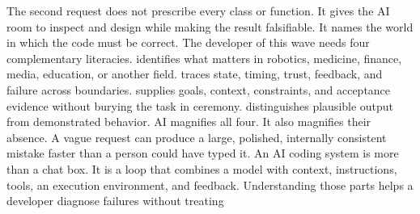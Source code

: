 {}\markdownRendererInterblockSeparator
{}The second request does not prescribe every class or function. It gives the AI\markdownRendererSoftLineBreak
{}room to inspect and design while making the result falsifiable. It names the\markdownRendererSoftLineBreak
{}world in which the code must be correct.\markdownRendererInterblockSeparator
{}
\markdownRendererSectionEnd \markdownRendererSectionBegin
{}\markdownRendererInterblockSeparator
{}The developer of this wave needs four complementary literacies.\markdownRendererInterblockSeparator
{}\markdownRendererOlBegin
{} identifies what matters in robotics, medicine, finance,\markdownRendererSoftLineBreak
{}media, education, or another field.\markdownRendererOlItemEnd 
{} traces state, timing, trust, feedback, and failure across\markdownRendererSoftLineBreak
{}boundaries.\markdownRendererOlItemEnd 
{} supplies goals, context, constraints, and\markdownRendererSoftLineBreak
{}acceptance evidence without burying the task in ceremony.\markdownRendererOlItemEnd 
{} distinguishes plausible output from demonstrated\markdownRendererSoftLineBreak
{}behavior.\markdownRendererOlItemEnd 
\markdownRendererOlEnd \markdownRendererInterblockSeparator
{}AI magnifies all four. It also magnifies their absence. A vague request can\markdownRendererSoftLineBreak
{}produce a large, polished, internally consistent mistake faster than a person\markdownRendererSoftLineBreak
{}could have typed it.\markdownRendererInterblockSeparator
{}\markdownRendererThematicBreak{}\markdownRendererInterblockSeparator
{}
\markdownRendererSectionEnd 
\markdownRendererSectionEnd \markdownRendererSectionBegin
{}\markdownRendererInterblockSeparator
{}An AI coding system is more than a chat box. It is a loop that combines a model\markdownRendererSoftLineBreak
{}with context, instructions, tools, an execution environment, and feedback.\markdownRendererSoftLineBreak
{}Understanding those parts helps a developer diagnose failures without treating\markdownRendererSoftLineBreak
